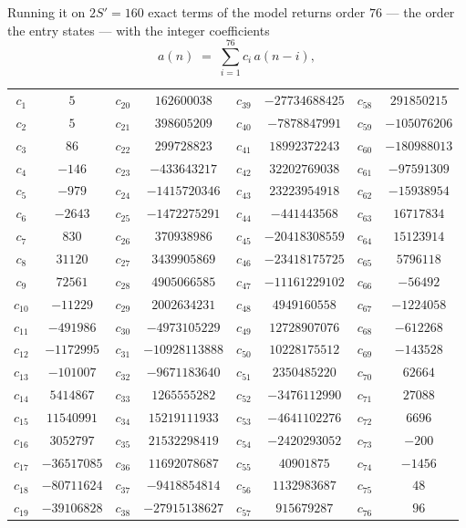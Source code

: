 \documentclass[11pt,a4paper]{article}
\theoremstyle{plain}
\theoremstyle{definition}
\begin{document}
Running it on $2S'=160$ exact terms of the model returns order $76$ --- the order the
entry states --- with the integer coefficients
\[
a(n)\;=\;\sum_{i=1}^{76}c_i\,a(n-i),
\]
\begin{center}\small
\begin{tabular}{cccccccc}
$c_{1}$ & $5$ & $c_{20}$ & $162600038$ & $c_{39}$ & $-27734688425$ & $c_{58}$ & $291850215$ \\
$c_{2}$ & $5$ & $c_{21}$ & $398605209$ & $c_{40}$ & $-7878847991$ & $c_{59}$ & $-105076206$ \\
$c_{3}$ & $86$ & $c_{22}$ & $299728823$ & $c_{41}$ & $18992372243$ & $c_{60}$ & $-180988013$ \\
$c_{4}$ & $-146$ & $c_{23}$ & $-433643217$ & $c_{42}$ & $32202769038$ & $c_{61}$ & $-97591309$ \\
$c_{5}$ & $-979$ & $c_{24}$ & $-1415720346$ & $c_{43}$ & $23223954918$ & $c_{62}$ & $-15938954$ \\
$c_{6}$ & $-2643$ & $c_{25}$ & $-1472275291$ & $c_{44}$ & $-441443568$ & $c_{63}$ & $16717834$ \\
$c_{7}$ & $830$ & $c_{26}$ & $370938986$ & $c_{45}$ & $-20418308559$ & $c_{64}$ & $15123914$ \\
$c_{8}$ & $31120$ & $c_{27}$ & $3439905869$ & $c_{46}$ & $-23418175725$ & $c_{65}$ & $5796118$ \\
$c_{9}$ & $72561$ & $c_{28}$ & $4905066585$ & $c_{47}$ & $-11161229102$ & $c_{66}$ & $-56492$ \\
$c_{10}$ & $-11229$ & $c_{29}$ & $2002634231$ & $c_{48}$ & $4949160558$ & $c_{67}$ & $-1224058$ \\
$c_{11}$ & $-491986$ & $c_{30}$ & $-4973105229$ & $c_{49}$ & $12728907076$ & $c_{68}$ & $-612268$ \\
$c_{12}$ & $-1172995$ & $c_{31}$ & $-10928113888$ & $c_{50}$ & $10228175512$ & $c_{69}$ & $-143528$ \\
$c_{13}$ & $-101007$ & $c_{32}$ & $-9671183640$ & $c_{51}$ & $2350485220$ & $c_{70}$ & $62664$ \\
$c_{14}$ & $5414867$ & $c_{33}$ & $1265555282$ & $c_{52}$ & $-3476112990$ & $c_{71}$ & $27088$ \\
$c_{15}$ & $11540991$ & $c_{34}$ & $15219111933$ & $c_{53}$ & $-4641102276$ & $c_{72}$ & $6696$ \\
$c_{16}$ & $3052797$ & $c_{35}$ & $21532298419$ & $c_{54}$ & $-2420293052$ & $c_{73}$ & $-200$ \\
$c_{17}$ & $-36517085$ & $c_{36}$ & $11692078687$ & $c_{55}$ & $40901875$ & $c_{74}$ & $-1456$ \\
$c_{18}$ & $-80711624$ & $c_{37}$ & $-9418854814$ & $c_{56}$ & $1132983687$ & $c_{75}$ & $48$ \\
$c_{19}$ & $-39106828$ & $c_{38}$ & $-27915138627$ & $c_{57}$ & $915679287$ & $c_{76}$ & $96$ \\
\end{tabular}
\end{center}
\end{document}
